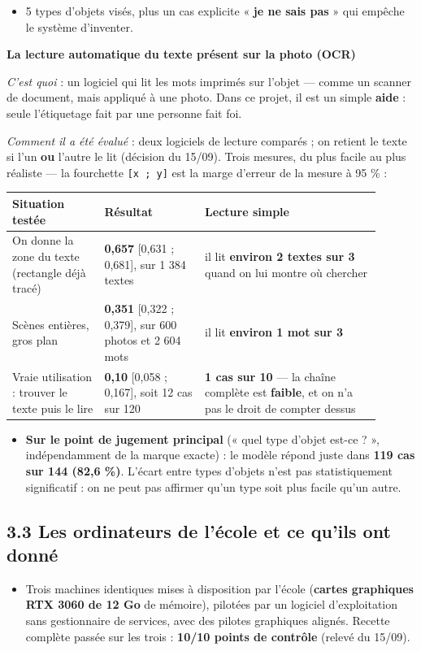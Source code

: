 \documentclass[11pt,a4paper]{article}
\begin{document}
\begin{itemize}  \item 5 types d'objets visés, plus un cas explicite « \textbf{je ne sais pas} » qui empêche le système d'inventer.
\end{itemize}

\textbf{La lecture automatique du texte présent sur la photo (OCR)}

\textit{C'est quoi} : un logiciel qui lit les mots imprimés sur l'objet — comme un scanner de document, mais appliqué à une photo. Dans ce projet, il est un simple \textbf{aide} : seule l'étiquetage fait par une personne fait foi.

\textit{Comment il a été évalué} : deux logiciels de lecture comparés ; on retient le texte si l'un \textbf{ou} l'autre le lit (décision du 15/09). Trois mesures, du plus facile au plus réaliste — la fourchette \texttt{[x ; y]} est la marge d'erreur de la mesure à 95 \% :

\sloppy
\begin{longtable}{|p{0.222\linewidth}|p{0.249\linewidth}|p{0.426\linewidth}|}
\hline
\textbf{Situation testée} & \textbf{Résultat} & \textbf{Lecture simple} \\ \hline
\endhead
On donne la zone du texte (rectangle déjà tracé) & \textbf{0,657} [0,631 ; 0,681], sur 1 384 textes & il lit \textbf{environ 2 textes sur 3} quand on lui montre où chercher \\ \hline
Scènes entières, gros plan & \textbf{0,351} [0,322 ; 0,379], sur 600 photos et 2 604 mots & il lit \textbf{environ 1 mot sur 3} \\ \hline
Vraie utilisation : trouver le texte puis le lire & \textbf{0,10} [0,058 ; 0,167], soit 12 cas sur 120 & \textbf{1 cas sur 10} — la chaîne complète est \textbf{faible}, et on n'a pas le droit de compter dessus \\ \hline
\end{longtable}
\begin{itemize}  \item \textbf{Sur le point de jugement principal} (« quel type d'objet est-ce ? », indépendamment de la marque exacte) : le modèle répond juste dans \textbf{119 cas sur 144 (82,6 \%)}. L'écart entre types d'objets n'est pas statistiquement significatif : on ne peut pas affirmer qu'un type soit plus facile qu'un autre.
\end{itemize}

\subsection*{3.3 Les ordinateurs de l'école et ce qu'ils ont donné}
\begin{itemize}  \item Trois machines identiques mises à disposition par l'école (\textbf{cartes graphiques RTX 3060 de 12 Go} de mémoire), pilotées par un logiciel d'exploitation sans gestionnaire de services, avec des pilotes graphiques alignés. Recette complète passée sur les trois : \textbf{10/10 points de contrôle} (relevé du 15/09).
\end{itemize}
\end{document}
